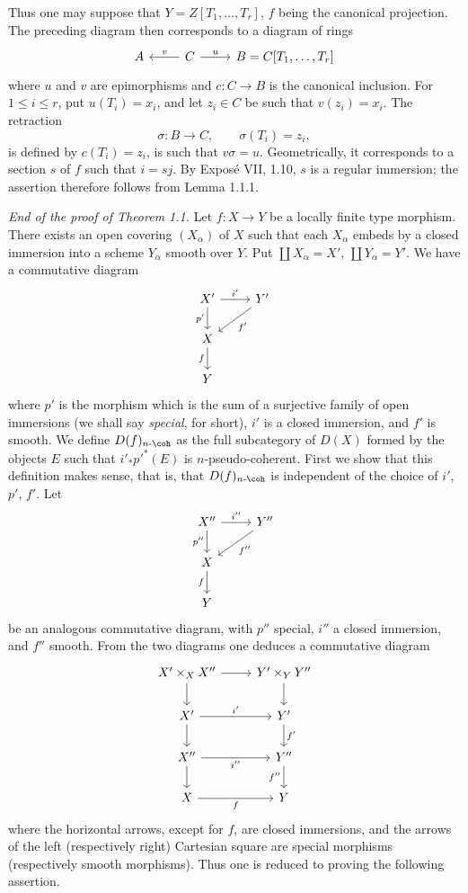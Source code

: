 Thus one may suppose that \(Y=Z[T_1,\ldots,T_r]\), \(f\) being the canonical projection. The preceding diagram then corresponds to a diagram of rings
\[
\begin{tikzcd}
A & C \arrow[l,"v"'] \arrow[r,"u"] & B=C[T_1,\ldots,T_r]
\end{tikzcd}
\]
where \(u\) and \(v\) are epimorphisms and \(c:C\to B\) is the canonical inclusion. For \(1\leq i\leq r\), put \(u(T_i)=x_i\), and let \(z_i\in C\) be such that \(v(z_i)=x_i\). The retraction
\[
  \sigma:B\longrightarrow C,\qquad \sigma(T_i)=z_i,
\]
is defined by \(c(T_i)=z_i\), is such that \(v\sigma=u\). Geometrically, it corresponds to a section \(s\) of \(f\) such that \(i=sj\). By Exposé VII, 1.10, \(s\) is a regular immersion; the assertion therefore follows from Lemma 1.1.1.

\emph{End of the proof of Theorem 1.1.} Let \(f:X\to Y\) be a locally finite type morphism. There exists an open covering \((X_\alpha)\) of \(X\) such that each \(X_\alpha\) embeds by a closed immersion into a scheme \(Y_\alpha\) smooth over \(Y\). Put \(\coprod X_\alpha=X'\), \(\coprod Y_\alpha=Y'\). We have a commutative diagram
\[
\begin{tikzcd}
X' \arrow[r,"i'"] \arrow[d,"p'"'] & Y' \arrow[dl,"f'"]\\
X \arrow[d,"f"']\\
Y
\end{tikzcd}
\]
where \(p'\) is the morphism which is the sum of a surjective family of open immersions (we shall say \emph{special}, for short), \(i'\) is a closed immersion, and \(f'\) is smooth. We define \(D(f)_{n\text{-}\coh}\) as the full subcategory of \(D(X)\) formed by the objects \(E\) such that \(i'_*p'^*(E)\) is \(n\)-pseudo-coherent. First we show that this definition makes sense, that is, that \(D(f)_{n\text{-}\coh}\) is independent of the choice of \(i'\), \(p'\), \(f'\). Let
\[
\begin{tikzcd}
X'' \arrow[r,"i''"] \arrow[d,"p''"'] & Y'' \arrow[dl,"f''"]\\
X \arrow[d,"f"']\\
Y
\end{tikzcd}
\]
be an analogous commutative diagram, with \(p''\) special, \(i''\) a closed immersion, and \(f''\) smooth. From the two diagrams one deduces a commutative diagram
\[
\begin{tikzcd}
X'\times_X X'' \arrow[r] \arrow[d] & Y'\times_Y Y'' \arrow[d]\\
X' \arrow[r,"i'"] \arrow[d] & Y' \arrow[d,"f'"]\\
X'' \arrow[r,"i''"'] \arrow[d] & Y'' \arrow[d,"f''"']\\
X \arrow[r,"f"'] & Y
\end{tikzcd}
\]
where the horizontal arrows, except for \(f\), are closed immersions, and the arrows of the left (respectively right) Cartesian square are special morphisms (respectively smooth morphisms). Thus one is reduced to proving the following assertion.

